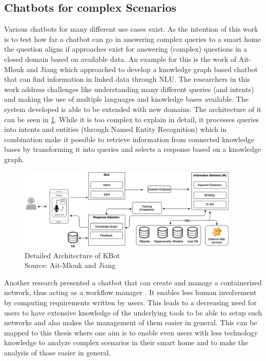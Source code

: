 \subsection{Chatbots for complex Scenarios}
Various chatbots for many different use cases exist. 
As the intention of this work is to test how far a chatbot can go in answering complex queries to a smart home the question aligns if approaches exist for answering (complex) questions in a closed domain based on available data.
An example for this is the work of Ait-Mlouk and Jiang \cite{ait-mlouk_kbot_2020} which approached to develop a knowledge graph based chatbot that can find information in linked data through NLU.
The researchers in this work address challenges like understanding many different queries (and intents) and making the use of multiple languages and knowledge bases available.
The system developed is able to be extended with new domains.
The architecture of it can be seen in \cref{fig:kbot}.
While it is too complex to explain in detail, it processes queries into intents and entities (through Named Entity Recognition) which in combination make it possible to retrieve information from connected knowledge bases by transforming it into queries and selects a response based on a knowledge graph.

\begin{figure}[h]
\centering
\includegraphics[width=0.94\textwidth]{graphics/KBot-architecture.png}
\caption{Detailed Architecture of KBot \\Source: Ait-Mlouk and Jiang \cite{ait-mlouk_kbot_2020}}
\label{fig:kbot}
\end{figure}

Another research presented a chatbot that can create and manage a containerized network, thus acting as a workflow manager \cite{jasinski_chatbot-based_2023}.
It enables less human involvement by computing requirements written by users.
This leads to a decreasing need for users to have extensive knowledge of the underlying tools to be able to setup such networks and also makes the management of them easier in general.
This can be mapped to this thesis where one aim is to enable even users with less technology knowledge to analyze complex scenarios in their smart home and to make the analysis of those easier in general.

